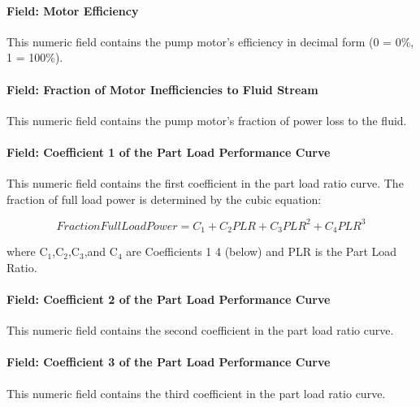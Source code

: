 \paragraph{Field: Motor Efficiency}\label{field-motor-efficiency-2-000}

This numeric field contains the pump motor's efficiency in decimal form (0 = 0\%, 1 = 100\%).

\paragraph{Field: Fraction of Motor Inefficiencies to Fluid Stream}\label{field-fraction-of-motor-inefficiencies-to-fluid-stream-2}

This numeric field contains the pump motor's fraction of power loss to the fluid.

\paragraph{Field: Coefficient 1 of the Part Load Performance Curve}\label{field-coefficient-1-of-the-part-load-performance-curve-1}

This numeric field contains the first coefficient in the part load ratio curve. The fraction of full load power is determined by the cubic equation:

\begin{equation}
FractionFullLoadPower = {C_1} + {C_2}PLR + {C_3}PL{R^2} + {C_4}PL{R^3}
\end{equation}

where C\(_{1}\),C\(_{2}\),C\(_{3}\),and C\(_{4}\) are Coefficients 1 4 (below) and PLR is the Part Load Ratio.

\paragraph{Field: Coefficient 2 of the Part Load Performance Curve}\label{field-coefficient-2-of-the-part-load-performance-curve-1}

This numeric field contains the second coefficient in the part load ratio curve.

\paragraph{Field: Coefficient 3 of the Part Load Performance Curve}\label{field-coefficient-3-of-the-part-load-performance-curve-1}

This numeric field contains the third coefficient in the part load ratio curve.

